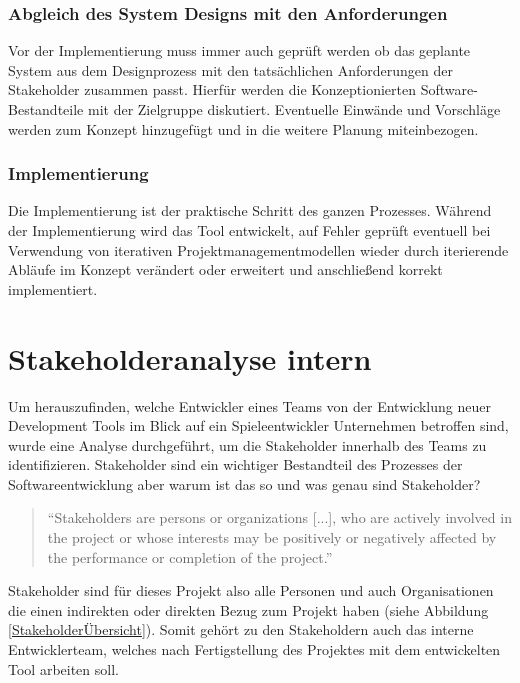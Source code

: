 \documentclass[pagesize, paper=a4, fontsize=12pt, titlepage=true, headings=small, headnosepline, abstractoff, liststotoc, nochapterprefix, plainheadsepline, twoside]{scrreprt}
\begin{document}
\subsubsection{Abgleich des System Designs mit den Anforderungen}
Vor der Implementierung muss immer auch geprüft werden ob das geplante System aus dem Designprozess mit den tatsächlichen Anforderungen der Stakeholder zusammen passt. Hierfür werden die Konzeptionierten Software-Bestandteile mit der Zielgruppe diskutiert. Eventuelle Einwände und Vorschläge werden zum Konzept hinzugefügt und in die weitere Planung miteinbezogen.

\subsubsection{Implementierung}
Die Implementierung ist der praktische Schritt des ganzen Prozesses. Während der Implementierung wird das Tool entwickelt, auf Fehler geprüft eventuell bei Verwendung von iterativen Projektmanagementmodellen wieder durch iterierende Abläufe im Konzept verändert oder erweitert und anschließend korrekt implementiert.

\section{Stakeholderanalyse intern}
Um herauszufinden, welche Entwickler eines Teams von der Entwicklung neuer Development Tools im Blick auf ein Spieleentwickler Unternehmen betroffen sind, wurde eine Analyse durchgeführt, um die Stakeholder innerhalb des Teams zu identifizieren. Stakeholder sind ein wichtiger Bestandteil des Prozesses der Softwareentwicklung aber warum ist das so und was genau sind Stakeholder?
\begin{quote}
“Stakeholders are persons or organizations [...], who are actively involved in the project or whose interests may be positively or negatively affected
by the performance or completion of the project.” 
\end{quote}
Stakeholder sind für dieses Projekt also alle Personen und auch Organisationen die einen indirekten oder direkten Bezug zum Projekt haben (siehe Abbildung \ref{StakeholderÜbersicht}). Somit gehört zu den Stakeholdern auch das interne Entwicklerteam, welches nach Fertigstellung des Projektes mit dem entwickelten Tool arbeiten soll.
\end{document}
